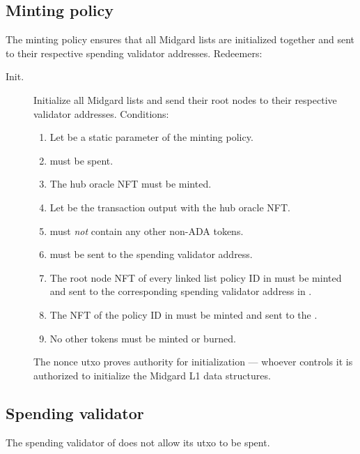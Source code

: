 \documentclass[../midgard.tex]{subfiles}
\begin{document}
\todo

\subsection{Minting policy}
\label{h:hub-oracle-minting-policy}

The  minting policy ensures that all Midgard lists are initialized together and sent to their respective spending validator addresses.
Redeemers:
\begin{description}
    \item[Init.] Initialize all Midgard lists and send their root nodes to their respective validator addresses.
      Conditions:
        \begin{enumerate}
            \item Let  be a static parameter of the  minting policy.
            \item {} must be spent.
            \item The hub oracle NFT must be minted.
            \item Let  be the transaction output with the hub oracle NFT.
            \item {} must \emph{not} contain any other non-ADA tokens.
            \item {} must be sent to the  spending validator address.
            \item The root node NFT of every linked list policy ID in  must be minted and sent to the corresponding spending validator address in .
            \item The NFT of the  policy ID in  must be minted and sent to the .
            \item No other tokens must be minted or burned.
        \end{enumerate}
    The nonce utxo proves authority for initialization --- whoever controls it is authorized to initialize the Midgard L1 data structures.
\end{description}

\subsection{Spending validator}
\label{h:hub-oracle-spending-validator}

The spending validator of  does not allow its utxo to be spent.
\end{document}

